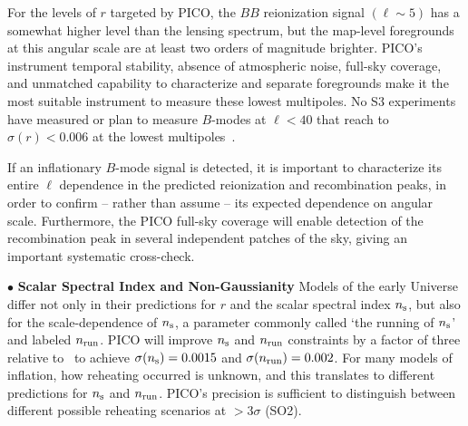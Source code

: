 \documentclass[PICOReport.tex]{subfiles}
\begin{document}
For the levels of $r$ targeted by PICO, the $BB$ reionization signal $(\ell \sim 5)$ has a somewhat higher level than the lensing spectrum, but the map-level foregrounds at this angular scale are at least two orders of magnitude brighter.  PICO's instrument temporal stability, absence of atmospheric noise, full-sky coverage, and unmatched capability to characterize and separate foregrounds make it the most suitable instrument to measure these lowest multipoles. No S3 experiments have measured or plan to measure $B$-modes at $\ell<40$ that reach to $\sigma(r) < 0.006$ at the lowest multipoles~\citep{class,piper}. 

If an inflationary $B$-mode signal is detected, it is important to characterize its entire $\ell$ dependence in the predicted reionization and  recombination peaks, in order to confirm -- rather than assume -- its expected dependence on angular scale.  Furthermore, the PICO full-sky coverage will enable detection of the recombination peak in several independent patches of the sky, giving an important systematic cross-check. 

\noindent$\bullet$ {\bf Scalar Spectral Index and Non-Gaussianity} \hspace{0.1in} Models of the early Universe differ not only in their predictions for $r$ and the scalar spectral index $n_{\rm s}$, but also for the scale-dependence of $n_{\rm s}$, a parameter commonly called `the running of $n_{\rm s}$' and labeled $n_{\rm run}$. PICO will improve $n_{\rm s}$ and $n_{\rm run}$ constraints by a factor of three relative to \planck\ to achieve $\sigma(n_{\rm s})=0.0015$ and $\sigma(n_{\rm run})=0.002$. For many models of inflation, how reheating occurred is unknown, and this translates to different predictions for $n_{\rm s}$ and $n_{\rm run}$. PICO's precision is sufficient to distinguish between different possible reheating scenarios at $>3\sigma$ (SO2). 
\end{document}
